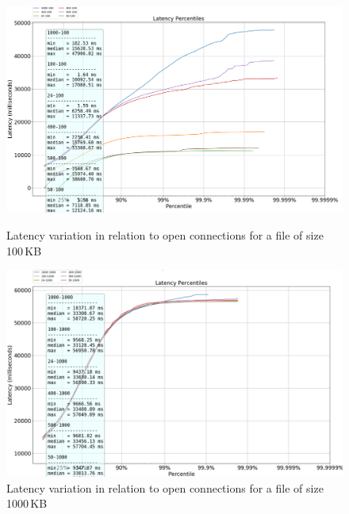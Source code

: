 \documentclass[runningheads]{llncs}
\begin{document}
\begin{figure}[H]
    \centering
    \begin{minipage}{0.49\textwidth}
        \centering
        \includegraphics[width=1\textwidth]{plotfile100.png}
        \caption{Latency variation in relation to open connections for a file of size 100\,KB}
			\label {fig:latency-to-oc-100}

    \end{minipage}\hfill
    \begin{minipage}{0.49\textwidth}
        \centering
        \includegraphics[width=1\textwidth]{plotfile1000.png}
        \caption{Latency variation in relation to open connections for a file of size 1000\,KB}
	   \label {fig:latency-to-oc-1000}
    \end{minipage}
\end{figure}
\end{document}
